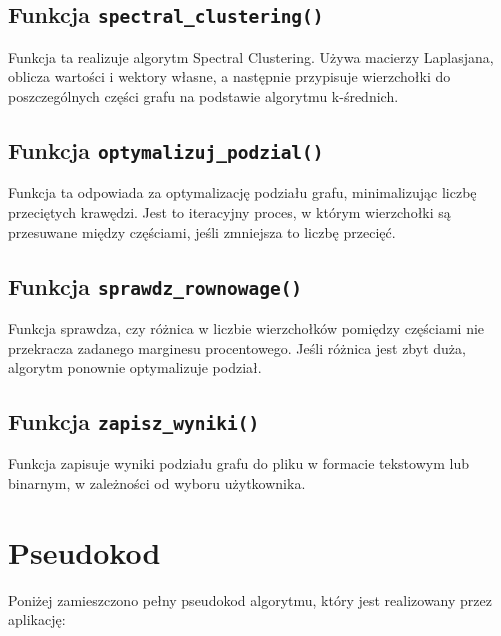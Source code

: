 \documentclass[a4paper,12pt]{article}
\begin{document}
\subsection{Funkcja \texttt{spectral\_clustering()}}
Funkcja ta realizuje algorytm Spectral Clustering. Używa macierzy Laplasjana, oblicza wartości i wektory własne, a następnie przypisuje wierzchołki do poszczególnych części grafu na podstawie algorytmu k-średnich.

\subsection{Funkcja \texttt{optymalizuj\_podzial()}}
Funkcja ta odpowiada za optymalizację podziału grafu, minimalizując liczbę przeciętych krawędzi. Jest to iteracyjny proces, w którym wierzchołki są przesuwane między częściami, jeśli zmniejsza to liczbę przecięć.

\subsection{Funkcja \texttt{sprawdz\_rownowage()}}
Funkcja sprawdza, czy różnica w liczbie wierzchołków pomiędzy częściami nie przekracza zadanego marginesu procentowego. Jeśli różnica jest zbyt duża, algorytm ponownie optymalizuje podział.

\subsection{Funkcja \texttt{zapisz\_wyniki()}}
Funkcja zapisuje wyniki podziału grafu do pliku w formacie tekstowym lub binarnym, w zależności od wyboru użytkownika.

\section{Pseudokod}

Poniżej zamieszczono pełny pseudokod algorytmu, który jest realizowany przez aplikację:
\end{document}
